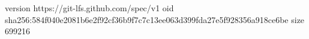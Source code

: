version https://git-lfs.github.com/spec/v1
oid sha256:584f040e2081b6e2f92cf36b9f7c7c13ee063d399fda27e5f928356a918ce6be
size 699216

